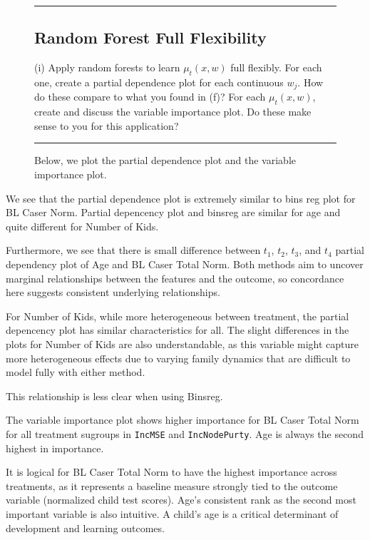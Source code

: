 \documentclass{article}
\newenvironment{colorparagraph}[1]{\par\color{#1}}{\par}
\begin{document}
\begin{figure}[H]
\begin{colorparagraph}{questioncolor}
\label{q3i}
\rule{\textwidth}{0.5pt}
\subsection{Random Forest Full Flexibility}
(i) Apply random forests to learn \( \mu_t(x, w) \) full flexibly. For each one, create a partial dependence plot for each continuous \( w_j \). How do these compare to what you found in (f)? For each \( \mu_t(x, w) \), create and discuss the variable importance plot. Do these make sense to you for this application?

\rule{\textwidth}{0.5pt}
\end{colorparagraph}

Below, we plot the partial dependence plot and the variable importance plot.
\end{figure}

We see that the partial dependence plot is extremely similar to bins reg plot for BL Caser Norm. Partial depencency plot and binsreg are similar for age and quite different for Number of Kids.

Furthermore, we see that there is small difference between $t_1$, $t_2$, $t_3$, and $t_4$ partial dependency plot of Age and BL Caser Total Norm. Both methods aim to uncover marginal relationships between the features and the outcome, so concordance here suggests consistent underlying relationships.

For Number of Kids, while more heterogeneous between treatment, the partial depencency plot has similar characteristics for all. The slight differences in the plots for Number of Kids are also understandable, as this variable might capture more heterogeneous effects due to varying family dynamics that are difficult to model fully with either method.

This relationship is less clear when using Binsreg. 

The variable importance plot shows higher importance for BL Caser Total Norm for all treatment sugroups in \texttt{IncMSE} and \texttt{IncNodePurty}. Age is always the second highest in importance.

It is logical for BL Caser Total Norm to have the highest importance across treatments, as it represents a baseline measure strongly tied to the outcome variable (normalized child test scores). Age's consistent rank as the second most important variable is also intuitive. A child's age is a critical determinant of development and learning outcomes.
\end{document}
